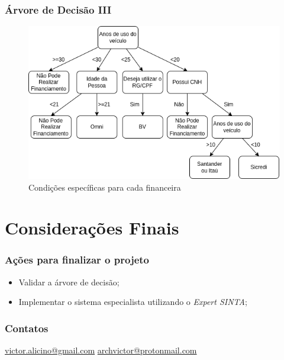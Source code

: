 \documentclass[12pt]{beamer}
\begin{document}
\begin{frame}
    \frametitle{Árvore de Decisão III}
    \begin{figure}[!h]
        \centering
        \includegraphics[height=.70\textheight]{condicoes_financeieras.png}
        \caption{Condições específicas para cada financeira}
    \end{figure}
\end{frame}

\section{Considerações Finais}
\begin{frame}
    \frametitle{Ações para finalizar o projeto}

    \begin{itemize}
        \item Validar a árvore de decisão;
        \item Implementar o sistema especialista utilizando o \textit{Expert SINTA};
    \end{itemize}

\end{frame}

\begin{frame}
    \frametitle{Contatos}
    \centering
    \url{victor.alicino@gmail.com}
    \url{archvictor@protonmail.com}
\end{frame}
\end{document}
